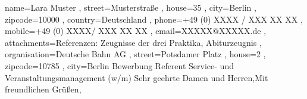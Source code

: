 \documentclass[a4paper, 12pt]{classycv}
\begin{document}
\begin{CoverLetter}[%
	submitter information line color=none%
	, recipient information line color=none%
	, has body separator=no%
	, has footer separator=no%
]{%
	name=Lara Muster%
	, street=Musterstraße%
	, house=35%
	, city=Berlin%
	, zipcode=10000%
	, country=Deutschland%
	, phone=+49 (0) XXXX / XXX XX XX%
	, mobile=+49 (0) XXXX/ XXX XX XX%
	, email=XXXXX@XXXXX.de%
	, attachments={Referenzen: Zeugnisse der drei Praktika, Abiturzeugnis}
}{%
	, organisation=Deutsche Bahn AG%
	, street=Potsdamer Platz%
	, house=2%
	, zipcode=10785%
	, city=Berlin%
}{Bewerbung Referent Service- und Veranstaltungsmanagement (w/m) }{Sehr geehrte Damen und Herren,}{Mit freundlichen Grüßen,}%
\blindtext[1]%
\end{CoverLetter}
\end{document}
